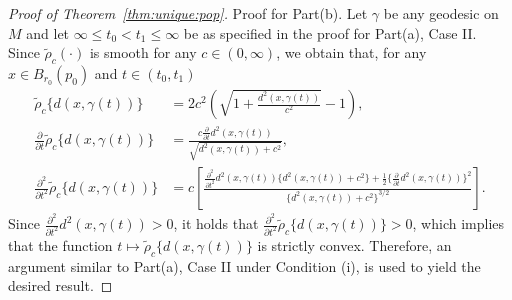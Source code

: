 \documentclass[preprint]{imsart}
\theoremstyle{plain}
\theoremstyle{remark}
\begin{document}
\begin{appendix}
\begin{proof}[Proof of Theorem~\ref{thm:unique:pop}]
Proof for Part(b). Let $\gamma$ be any geodesic on $M$ and let $\infty \le t_0< t_1 \le \infty$ be as specified in the proof for Part(a), Case II.  Since $\tilde{\rho}_c(\cdot)$ is smooth for any $c \in (0,\infty)$, 
 we obtain that, for any $x\in B_{r_0}(p_0)$ and $t \in (t_0,t_1)$
\begin{align*}
    \tilde{\rho}_c\{ d(x,\gamma(t))\} &= 2c^2 \left( \sqrt{1 + \frac{d^2(x,\gamma(t))}{c^2}} - 1\right),\\
    \frac{\partial}{\partial t} \tilde{\rho}_c\{ d(x,\gamma(t))\} & =  \frac{ c \tfrac{\partial}{\partial t} d^2(x,\gamma(t))}{  \sqrt{d^2(x,\gamma(t)) + c^2} }, \\
       \frac{\partial^2}{\partial t^2} \tilde{\rho}_c\{ d(x,\gamma(t))\} &  = c \left[
       \frac{ \tfrac{\partial^2}{\partial t^2} d^2(x,\gamma(t))  \{d^2(x,\gamma(t)) + c^2\} + \tfrac{1}{2} \{ \tfrac{\partial}{\partial t} d^2(x,\gamma(t)) \}^2 }
       { \{ d^2(x,\gamma(t)) + c^2\}^{3/2}}
       \right].
\end{align*}
Since $\tfrac{\partial^2}{\partial t^2} d^2(x, \gamma(t))  > 0$, it holds that $\frac{\partial^2}{\partial t^2} \tilde{\rho}_c\{ d(x,\gamma(t))\} > 0$, which implies that the function $t \mapsto  \tilde{\rho}_c \{d(x,\gamma(t))\}$ is strictly convex. Therefore, an argument similar to Part(a), Case II under Condition (i), is used to yield the desired result.
\end{proof}





\end{appendix}
\end{document}
